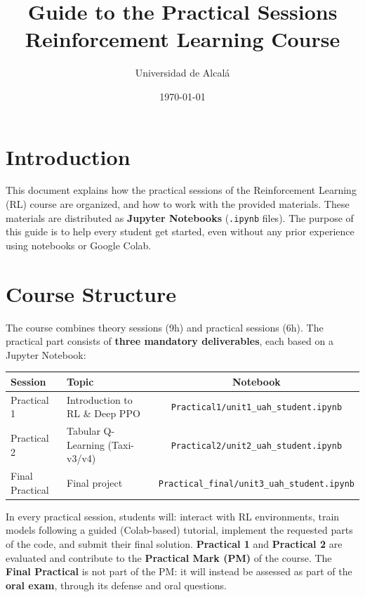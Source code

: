 \documentclass[11pt,a4paper]{article}
\title{\bfseries Guide to the Practical Sessions \\ \large Reinforcement Learning Course}
\author{Universidad de Alcal\'a}
\date{\today}
\begin{document}
\maketitle
\thispagestyle{empty}

\tableofcontents
\newpage

\section{Introduction}
This document explains how the practical sessions of the Reinforcement Learning (RL) course are organized, and how to work with the provided materials. These materials are distributed as \textbf{Jupyter Notebooks} (\texttt{.ipynb} files). The purpose of this guide is to help every student get started, even without any prior experience using notebooks or Google Colab.

\section{Course Structure}

The course combines theory sessions (9h) and practical sessions (6h). The practical part consists of \textbf{three mandatory deliverables}, each based on a Jupyter Notebook:

\begin{table}[h!]
\centering
\begin{tabularx}{\textwidth}{l X c}
\toprule
\textbf{Session} & \textbf{Topic} & \textbf{Notebook} \\
\midrule
Practical 1 & Introduction to RL \& Deep PPO & \texttt{Practical1/unit1\_uah\_student.ipynb} \\
Practical 2 & Tabular Q-Learning (Taxi-v3/v4) & \texttt{Practical2/unit2\_uah\_student.ipynb} \\
Final Practical & Final project & \texttt{Practical\_final/unit3\_uah\_student.ipynb} \\
\bottomrule
\end{tabularx}
\end{table}

In every practical session, students will: interact with RL environments, train models following a guided (Colab-based) tutorial, implement the requested parts of the code, and submit their final solution. \textbf{Practical 1} and \textbf{Practical 2} are evaluated and contribute to the \textbf{Practical Mark (PM)} of the course. The \textbf{Final Practical} is not part of the PM: it will instead be assessed as part of the \textbf{oral exam}, through its defense and oral questions.
\end{document}
